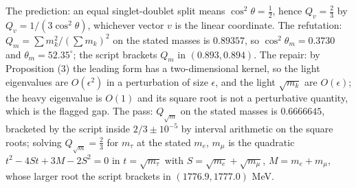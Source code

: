 The prediction: an equal singlet-doublet split means $\cos^{2}\theta = \tfrac12$, hence $Q_{v} = \tfrac23$ by $Q_{v} = 1/(3\cos^{2}\theta)$, whichever vector $v$ is the linear coordinate. The refutation: $Q_{m} = \sum m_{k}^{2}/(\sum m_{k})^{2}$ on the stated masses is $0.89357$, so $\cos^{2}\theta_{m} = 0.3730$ and $\theta_{m} = 52.35^{\circ}$; the script brackets $Q_{m}$ in $(0.893, 0.894)$. The repair: by Proposition (3) the leading form has a two-dimensional kernel, so the light eigenvalues are $O(\epsilon^{2})$ in a perturbation of size $\epsilon$, and the light $\sqrt{m_{k}}$ are $O(\epsilon)$; the heavy eigenvalue is $O(1)$ and its square root is not a perturbative quantity, which is the flagged gap. The pass: $Q_{\sqrt{m}}$ on the stated masses is $0.6666645$, bracketed by the script inside $2/3 \pm 10^{-5}$ by interval arithmetic on the square roots; solving $Q_{\sqrt{m}} = \tfrac23$ for $m_{\tau}$ at the stated $m_{e}$, $m_{\mu}$ is the quadratic $t^{2} - 4St + 3M - 2S^{2} = 0$ in $t = \sqrt{m_{\tau}}$ with $S = \sqrt{m_{e}} + \sqrt{m_{\mu}}$, $M = m_{e} + m_{\mu}$, whose larger root the script brackets in $(1776.9, 1777.0)$ MeV.
